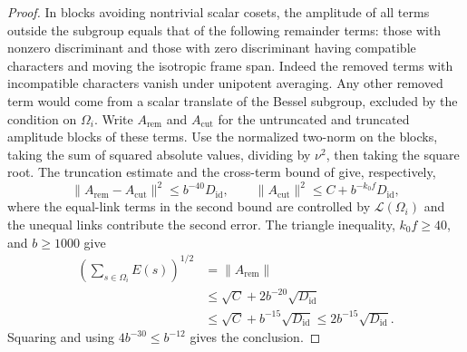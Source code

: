 \begin{proof}
In blocks avoiding nontrivial scalar cosets, the amplitude of all terms outside the subgroup equals that of the following remainder terms:
those with nonzero discriminant and those with zero discriminant having compatible characters and moving the isotropic frame span.
Indeed the removed terms with incompatible characters vanish under unipotent averaging.
Any other removed term would come from a scalar translate of the Bessel subgroup,
excluded by the condition on $\Omega_i$.
Write $A_{\mathrm{rem}}$ and $A_{\mathrm{cut}}$ for the untruncated and truncated amplitude blocks of these terms.
Use the normalized two-norm on the blocks, taking the sum of squared absolute values, dividing by $\nu^2$, then taking the square root.
The truncation estimate and the cross-term bound of  give, respectively,
\[
 \|A_{\mathrm{rem}}-A_{\mathrm{cut}}\|^2
 \le b^{-40}D_{\mathrm{id}},\qquad
 \|A_{\mathrm{cut}}\|^2\le C+b^{-k_0f}D_{\mathrm{id}},
\]
where the equal-link terms in the second bound are controlled by $\mathcal L(\Omega_i)$ and the unequal links contribute the second error.
The triangle inequality, $k_0f\ge40$, and $b\ge1000$ give
\[
 \begin{aligned}
 \left(\sum_{s\in\Omega_i}E(s)\right)^{1/2}
 &=\|A_{\mathrm{rem}}\|\\
 &\le \sqrt C+2b^{-20}\sqrt{D_{\mathrm{id}}}\\
 &\le \sqrt C+b^{-15}\sqrt{D_{\mathrm{id}}}
 \le 2b^{-15}\sqrt{D_{\mathrm{id}}}.
 \end{aligned}
\]
Squaring and using $4b^{-30}\le b^{-12}$ gives the conclusion.
\end{proof}

